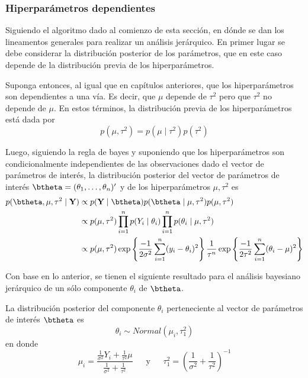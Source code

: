 \subsubsection{Hiperparámetros dependientes}

Siguiendo el algoritmo dado al comienzo de esta sección, en dónde se dan los lineamentos generales para realizar un análisis jerárquico. En primer lugar se debe considerar la distribución posterior de los parámetros, que en este caso depende de la distribución previa de los hiperparámetros.

Suponga entonces, al igual que en capítulos anteriores, que los hiperparámetros son dependientes a una vía. Es decir, que $\mu$ depende de $\tau^2$ pero que $\tau^2$ no depende de $\mu$. En estos términos, la distribución previa de los hiperparámetros está dada por
\begin{equation*}
p(\mu,\tau^2)=p(\mu \mid \tau^2)p(\tau^2)
\end{equation*}

Luego, siguiendo la regla de bayes y suponiendo que los hiperparámetros son condicionalmente independientes de las observaciones dado el vector de parámetros de interés, la distribución posterior del vector de parámetros de interés $\btheta=(\theta_1,\ldots,\theta_n)'$ y de los hiperparámetros $\mu, \tau^2$ es
\begin{align*}
p(\btheta,\mu,\tau^2 \mid \mathbf{Y})
&\propto p(\mathbf{Y} \mid \btheta)p(\btheta \mid \mu,\tau^2)p(\mu,\tau^2)  \\
&\propto p(\mu,\tau^2) \prod_{i=1}^n p(Y_i \mid \theta_i) \prod_{i=1}^n p(\theta_i \mid \mu,\tau^2)  \\
&\propto p(\mu,\tau^2) \exp\left\{\frac{-1}{2\sigma^2}\sum_{i=1}^n(y_i-\theta_i)^2\right\}
\frac{1}{\tau^n}\exp\left\{\frac{-1}{2\tau^2}\sum_{i=1}^n(\theta_i-\mu)^2\right\}
\end{align*}

Con base en lo anterior, se tienen el siguiente resultado para el análisis bayesiano jerárquico de un sólo componente $\theta_i$ de $\btheta$.

\begin{Res}
La distribución posterior del componente $\theta_i$ perteneciente al vector de parámetros de interés $\btheta$ es
\begin{equation*}
\theta_i\sim Normal(\mu_i,\tau_1^2)
\end{equation*}
en donde
\begin{equation*}
\mu_i=\frac{\frac{1}{\sigma^2}Y_i+\frac{1}{\tau^2}\mu}{\frac{1}{\sigma^2}+\frac{1}{\tau^2}}
\ \ \ \ \ \ \ \text{y} \ \ \ \ \ \ \
\tau_1^2=\left(\frac{1}{\sigma^2}+\frac{1}{\tau^2}\right)^{-1}
\end{equation*}
\end{Res}

